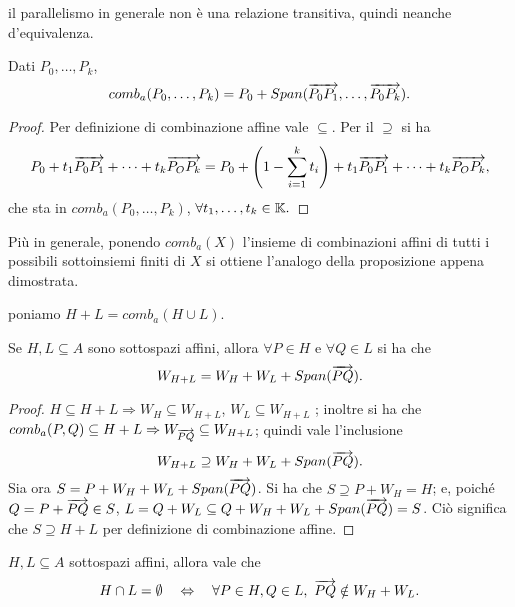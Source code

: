  \begin{remark}
 il parallelismo in generale non è una relazione transitiva, quindi neanche d'equivalenza.
 \end{remark}

 \begin{proposition}
 Dati $P_0,\dots,P_k$,
 \[
	comb_a(P_0,\dots,P_k)= P_0+Span(\overrightarrow{P_0P_1},\dots,\overrightarrow{P_0P_k}).
 \]
 \end{proposition}
 
 \begin{proof}
 Per definizione di combinazione affine vale $\subseteq$. Per il $\supseteq$ si ha
 \[
	P_0+t_1\overrightarrow{P_0P_1}+\dots+t_k\overrightarrow{P_OP_k} 
		=P_0+\left(1-\sum_{i=1}^{k}t_i\right)+t_1\overrightarrow{P_0P_1}+\dots+t_k\overrightarrow{P_OP_k},
 \]
 che sta in $comb_a(P_0,\dots,P_k)$, $\forall t_1,\dots,t_k\in \mathbb K.$
 \end{proof}
 
 Più in generale, ponendo $comb_a(X)$ l'insieme di combinazioni affini di tutti i possibili sottoinsiemi finiti di $X$
 si ottiene l'analogo della proposizione appena dimostrata.
 
 \begin{definition}
	poniamo $H+L = comb_a(H\cup L)$.
 \end{definition}
 
 \begin{proposition}[Giacitura di $H+L$] Se $H,L\subseteq A$ sono sottospazi affini, allora
 $\forall P\in H$ e $\forall Q \in L$ si ha che
 \[
	W_{H+L}=W_H+W_L+Span(\overrightarrow{PQ}).
 \]
 \end{proposition}

 \begin{proof}
  $H\subseteq H+L \Rightarrow W_H \subseteq W_{H+L}$, $W_L \subseteq W_{H+L}$ ; inoltre si ha che
 $comb_a(P,Q)\subseteq H+L \Rightarrow W_{\overrightarrow{PQ}}\subseteq W_{H+L}$; quindi vale l'inclusione
 \[
	W_{H+L}\supseteq W_H+W_L+Span(\overrightarrow{PQ}).
 \]
 Sia ora $S=P+W_H+W_L+Span(\overrightarrow{PQ})$. Si ha che $S\supseteq P+W_H = H$; e, poiché $Q= P+ \overrightarrow{PQ}\in S$,
 $L=Q+W_L \subseteq Q+W_H+W_L+Span(\overrightarrow{PQ})=S$. Ciò significa che $S\supseteq H+L$ per definizione di combinazione
 affine.
 \end{proof}
 
 \begin{lemma}
  $H,L\subseteq A$ sottospazi affini, allora vale che
 \[
	H\cap L = \emptyset\quad \Leftrightarrow\quad \forall P\in H, Q \in L,\ \vet{PQ}\notin W_H+W_L.
 \]
 \end{lemma}
 
